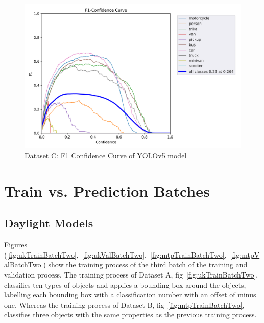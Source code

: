 \documentclass[12pt]{report} %
\begin{document}
		\begin{figure}[hb]
			\centering
			\includegraphics[width=.65\columnwidth]{Figures/dataset_c/F1_curve.png}
			\caption{Dataset C: F1 Confidence Curve of YOLOv5 model}
			\label{fig:ntDatasetYolov5MediumWeightF1Curve}
		\end{figure}

	\clearpage
	\section{Train vs. Prediction Batches}
		\subsection*{Daylight Models}
			Figures (\ref{fig:ukTrainBatchTwo},~\ref{fig:ukValBatchTwo},~\ref{fig:mtpTrainBatchTwo},~\ref{fig:mtpValBatchTwo}) show the training process of the third batch of the training and validation process. The training process of Dataset A, fig~\ref{fig:ukTrainBatchTwo}, classifies ten types of objects and applies a bounding box around the objects, labelling each bounding box with a classification number with an offset of minus one. Whereas the training process of Dataset B, fig~\ref{fig:mtpTrainBatchTwo}, classifies three objects with the same properties as the previous training process.
\end{document}
